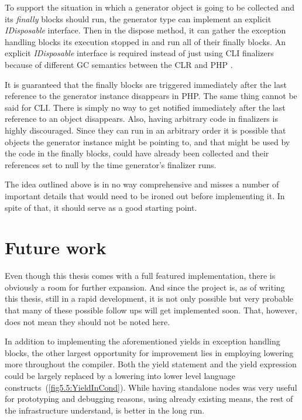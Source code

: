 To support the situation in which a generator object is going to be collected and its \emph{finally} blocks should run, the generator type can implement an explicit \emph{IDisposable} interface. Then in the dispose method, it can gather the exception handling blocks its execution stopped in and run all of their finally blocks. An explicit \emph{IDisposable} interface is required instead of just using CLI finalizers because of different GC semantics between the CLR and PHP \citep{GenPHPRFC, CSharpEcma}. 

It is guaranteed that the finally blocks are triggered immediately after the last reference to the generator instance disappears in PHP. The same thing cannot be said for CLI. There is simply no way to get notified immediately after the last reference to an object disappears. Also, having arbitrary code in finalizers is highly discouraged. Since they can run in an arbitrary order it is possible that objects the generator instance might be pointing to, and that might be used by the code in the finally blocks, could have already been collected and their references set to null by the time generator’s finalizer runs. 

The idea outlined above is in no way comprehensive and misses a number of important details that would need to be ironed out before implementing it. In spite of that, it should serve as a good starting point.

\section{Future work}

Even though this thesis comes with a full featured implementation, there is obviously a room for further expansion. And since the project is, as of writing this thesis, still in a rapid development, it is not only possible but very probable that many of these possible follow ups will get implemented soon. That, however, does not mean they should not be noted here.

In addition to implementing the aforementioned yields in exception handling blocks, the other largest opportunity for improvement lies in employing lowering more throughout the compiler. Both the yield statement and the yield expression could be largely replaced by a lowering into lower level language constructs~\mbox{(\autoref{fig5.5:YieldInCond})}. While having standalone nodes was very useful for prototyping and debugging reasons, using already existing means, the rest of the infrastructure understand, is better in the long run. 

